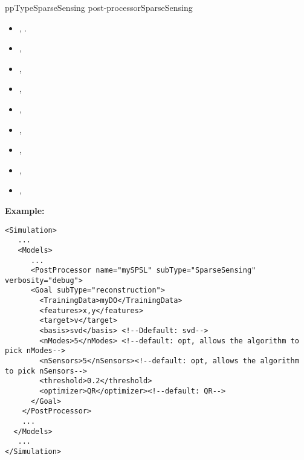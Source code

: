 ppType{SparseSensing post-processor}{SparseSensing}
\begin{itemize}
	\item {}, .
	\item {}, 
	\item {}, 
	\item {}, 
	\item {}, 
	\item {}, 
	\item {}, 
	\item {}, 
	\item {}, 
\end{itemize}

\textbf{Example:}
\begin{lstlisting}[style=XML]
<Simulation>
   ...
   <Models>
      ...
      <PostProcessor name="mySPSL" subType="SparseSensing" verbosity="debug">
      <Goal subType="reconstruction">
        <TrainingData>myDO</TrainingData>
        <features>x,y</features>
        <target>v</target>
        <basis>svd</basis> <!--Ddefault: svd-->
        <nModes>5</nModes> <!--default: opt, allows the algorithm to pick nModes-->
        <nSensors>5</nSensors><!--default: opt, allows the algorithm to pick nSensors-->
        <threshold>0.2</threshold>
        <optimizer>QR</optimizer><!--default: QR-->
      </Goal>
    </PostProcessor>
    ...
  </Models>
   ...
</Simulation>
\end{lstlisting}